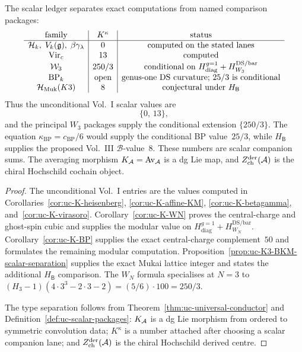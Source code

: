 \begin{corollary}
\label{cor:uc-family-wise-kappa-bucket}
\ClaimStatusConditional
The scalar ledger separates exact computations from named comparison
packages:
\[
\begin{array}{c|c|c}
\textup{family} & K^\kappa & \textup{status} \\
\hline
\mathcal H_k,\;V_k(\mathfrak{g}),\;\beta\gamma_\lambda & 0 &
\textup{computed on the stated lanes}\\
\mathrm{Vir}_c & 13 & \textup{computed}\\
\mathcal W_3 & 250/3 &
\textup{conditional on }H_{\mathrm{diag}}^{g=1}
+H_{W_3}^{\mathrm{DS/bar}}\\
\mathrm{BP}_k & \textup{open} &
\textup{genus-one DS curvature; }25/3\textup{ is conditional}\\
\mathcal H_{\mathrm{Muk}}(K3) & 8 &
\textup{conjectural under }H_{\mathsf B}
\end{array}
\]
Thus the unconditional Vol.~I scalar values are
\[
 \{0,\,13\},
\]
and the principal $W_3$ packages supply the conditional extension
$\{250/3\}$.  The equation
$\kappa_{\mathrm{BP}}=c_{\mathrm{BP}}/6$ would supply the conditional
BP value~$25/3$, while $H_{\mathsf B}$ supplies the proposed
Vol.~III $\mathcal B$-value~$8$.  These numbers are scalar companion
sums.  The
averaging morphism $K_{\mathcal{A}}=\operatorname{Av}_{\mathcal{A}}$ is a dg Lie map, and
$Z^{\mathrm{der}}_{\mathrm{ch}}(\mathcal{A})$ is the chiral Hochschild cochain object.
\end{corollary}

\begin{proof}
The unconditional Vol.~I entries are the values computed in
Corollaries~\ref{cor:uc-K-heisenberg},
\ref{cor:uc-K-affine-KM}, \ref{cor:uc-K-betagamma},
and~\ref{cor:uc-K-virasoro}.  Corollary~\ref{cor:uc-K-WN} proves the
central-charge and ghost-spin cubic and supplies the modular value on
$H_{\mathrm{diag}}^{g=1}+H_{W_N}^{\mathrm{DS/bar}}$.
Corollary~\ref{cor:uc-K-BP} supplies the exact central-charge
complement~$50$ and formulates the remaining modular computation.
Proposition~\ref{prop:uc-K3-BKM-scalar-separation}
supplies the exact Mukai lattice integer and states the additional
$H_{\mathsf B}$ comparison. The $W_N$ formula
specialises at $N=3$ to
$(H_3-1)(4\cdot3^3-2\cdot3-2)=(5/6)\cdot100=250/3$.

The type separation follows from
Theorem~\ref{thm:uc-universal-conductor} and
Definition~\ref{def:uc-scalar-packages}: $K_{\mathcal{A}}$ is a dg Lie morphism
from ordered to symmetric convolution data; $K^\kappa$ is a number
attached after choosing a scalar companion lane; and
$Z^{\mathrm{der}}_{\mathrm{ch}}(\mathcal{A})$ is the chiral Hochschild derived centre.
\end{proof}


